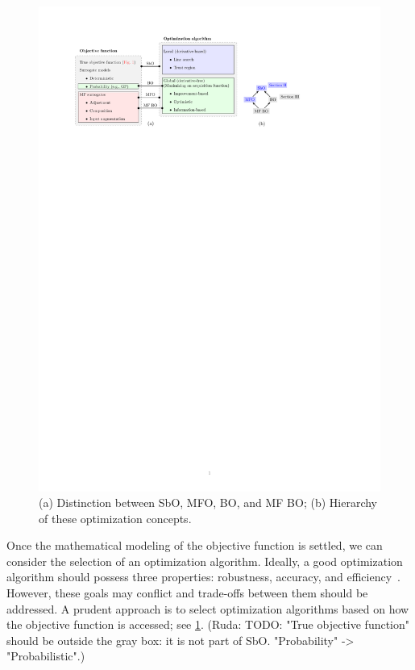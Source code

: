 \documentclass[journal ]{new-aiaa}
\newcommand{\cmtR}[1]{\textcolor{red!50!black}{(Ruda: #1)}} %
\begin{document}
\begin{figure}
	\centering
	\includegraphics[scale=0.82]{Fig2.pdf}
	\caption{(a) Distinction between SbO, MFO, BO, and MF BO; (b) Hierarchy of these optimization concepts.}
	\label{Fig-2}
\end{figure}

Once the mathematical modeling of the objective function is settled, we can consider the selection of an optimization algorithm.
Ideally, a good optimization algorithm should possess three properties: robustness, accuracy, and efficiency~\citep{Nocedal2006}.
However, these goals may conflict and trade-offs between them should be addressed.
A prudent approach is to select optimization algorithms based on how the objective function is accessed; see \cref{Fig-2}.
\cmtR{TODO:
"True objective function" should be outside the gray box: it is not part of SbO.
"Probability" -> "Probabilistic".}
\end{document}
